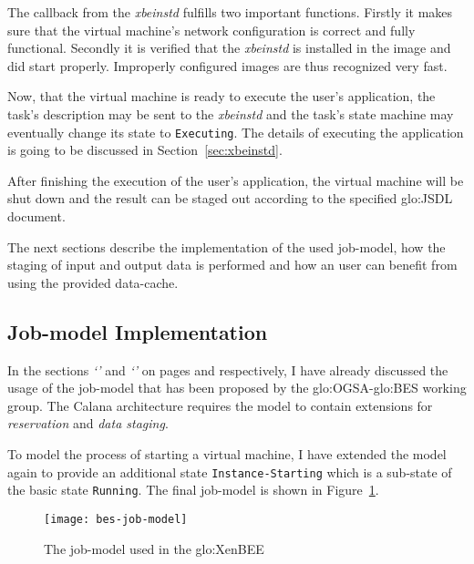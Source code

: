 The callback  from the  \emph{xbeinstd} fulfills two  important functions.
Firstly it makes sure that  the virtual machine's network configuration is
correct  and   fully  functional.   Secondly  it  is   verified  that  the
\emph{xbeinstd}  is  installed  in  the  image  and  did  start  properly.
Improperly configured images are thus recognized very fast.

Now, that the virtual machine  is ready to execute the user's application,
the task's description  may be sent to the  \emph{xbeinstd} and the task's
state machine  may eventually change its state  to \texttt{Executing}. The
details  of  executing  the  application  is  going  to  be  discussed  in
Section~\ref{sec:xbeinstd}.

After  finishing the  execution  of the  user's  application, the  virtual
machine will  be shut down and the  result can be staged  out according to
the specified \gls{glo:JSDL} document.

The next sections  describe the implementation of the  used job-model, how
the staging  of input  and output data  is performed  and how an  user can
benefit from using the provided data-cache.

\subsection{Job-model Implementation}
\label{sec:xbed:job-model}

In     the     sections    \emph{`'}     and
\emph{`'}               on               pages
\pageref{sec:fundamentals:bes}       and      \pageref{sec:calana-support}
respectively, I have already discussed the usage of the job-model that has
been  proposed  by the  \gls{glo:OGSA}-\gls{glo:BES}  working group.   The
Calana  architecture   requires  the  model  to   contain  extensions  for
\emph{reservation} and \emph{data staging}.

To model  the process of starting  a virtual machine, I  have extended the
model  again  to provide  an  additional state  \texttt{Instance-Starting}
which  is a  sub-state  of  the basic  state  \texttt{Running}. The  final
job-model is shown in Figure~\ref{fig:bes-job-model}.

\begin{figure}[ht]
  \centering
  \texttt{[image: bes-job-model]}
  \caption{The job-model used in the \gls{glo:XenBEE}}
  \label{fig:bes-job-model}
\end{figure}

